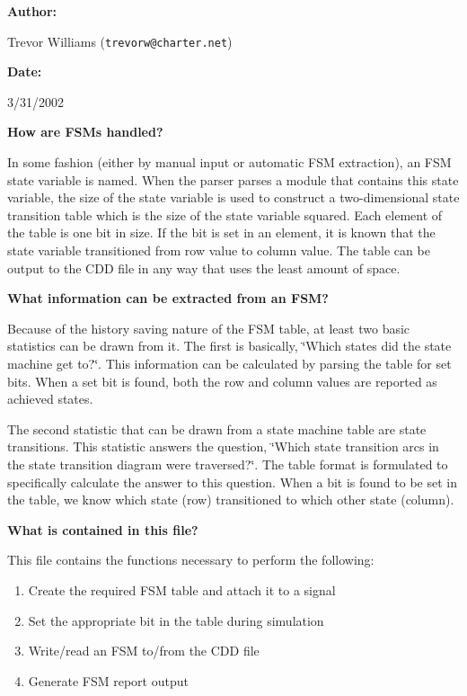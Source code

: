 \begin{Desc}
\item[{\bf Author: }]\par
Trevor Williams ({\tt trevorw@charter.net}) \end{Desc}
\begin{Desc}
\item[{\bf Date: }]\par
3/31/2002\end{Desc}
\begin{Desc}
\item[{\bf How are FSMs handled?}]\par
 In some fashion (either by manual input or automatic FSM extraction), an FSM state variable is named. When the parser parses a module that contains this state variable, the size of the state variable is used to construct a two-dimensional state transition table which is the size of the state variable squared. Each element of the table is one bit in size. If the bit is set in an element, it is known that the state variable transitioned from row value to column value. The table can be output to the CDD file in any way that uses the least amount of space.\end{Desc}
\begin{Desc}
\item[{\bf What information can be extracted from an FSM?}]\par
 Because of the history saving nature of the FSM table, at least two basic statistics can be drawn from it. The first is basically, \char`\"{}Which states did the state machine get to?\char`\"{}. This information can be calculated by parsing the table for set bits. When a set bit is found, both the row and column values are reported as achieved states.

 The second statistic that can be drawn from a state machine table are state transitions. This statistic answers the question, \char`\"{}Which state transition arcs in the state transition diagram were traversed?\char`\"{}. The table format is formulated to specifically calculate the answer to this question. When a bit is found to be set in the table, we know which state (row) transitioned to which other state (column).\end{Desc}
\begin{Desc}
\item[{\bf What is contained in this file?}]\par
 This file contains the functions necessary to perform the following:\begin{enumerate}
\item 
Create the required FSM table and attach it to a signal\item 
Set the appropriate bit in the table during simulation\item 
Write/read an FSM to/from the CDD file\item 
Generate FSM report output\end{enumerate}
\end{Desc}


